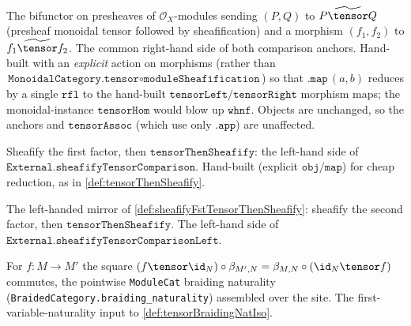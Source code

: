 \begin{definition}

  \label{def:tensorThenSheafify}
  The bifunctor on presheaves of $\mathcal{O}_X$-modules sending $(P,Q)$ to
  $\widetilde{P \tensor Q}$ (presheaf monoidal tensor followed by sheafification) and a
  morphism $(f_1,f_2)$ to $\widetilde{f_1 \tensor f_2}$. The common right-hand side of
  both comparison anchors. Hand-built with an \emph{explicit} action on morphisms (rather
  than $\texttt{MonoidalCategory.tensor} \circ \texttt{moduleSheafification}$) so that
  $\texttt{.map}\,(a,b)$ reduces by a single $\texttt{rfl}$ to the hand-built
  $\texttt{tensorLeft}/\texttt{tensorRight}$ morphism maps; the monoidal-instance
  $\texttt{tensorHom}$ would blow up $\texttt{whnf}$. Objects are unchanged, so the
  anchors and $\texttt{tensorAssoc}$ (which use only $\texttt{.app}$) are unaffected.
\end{definition}

\begin{definition}

  \label{def:sheafifyFstTensorThenSheafify}
  Sheafify the first factor, then $\texttt{tensorThenSheafify}$: the left-hand side of
  $\texttt{External.sheafifyTensorComparison}$. Hand-built (explicit
  $\texttt{obj}/\texttt{map}$) for cheap reduction, as in \cref{def:tensorThenSheafify}.
\end{definition}

\begin{definition}

  \label{def:sheafifySndTensorThenSheafify}
  The left-handed mirror of \cref{def:sheafifyFstTensorThenSheafify}: sheafify the second
  factor, then $\texttt{tensorThenSheafify}$. The left-hand side of
  $\texttt{External.sheafifyTensorComparisonLeft}$.
\end{definition}

\begin{lemma}

  \label{lem:presheafTensorBraiding_naturality}
  For $f : M \to M'$ the square
  $(f \tensor \id_N) \circ \beta_{M',N} = \beta_{M,N} \circ (\id_N \tensor f)$ commutes,
  the pointwise \texttt{ModuleCat} braiding naturality
  (\texttt{BraidedCategory.braiding\_naturality}) assembled over the site. The
  first-variable-naturality input to \cref{def:tensorBraidingNatIso}.
\end{lemma}

